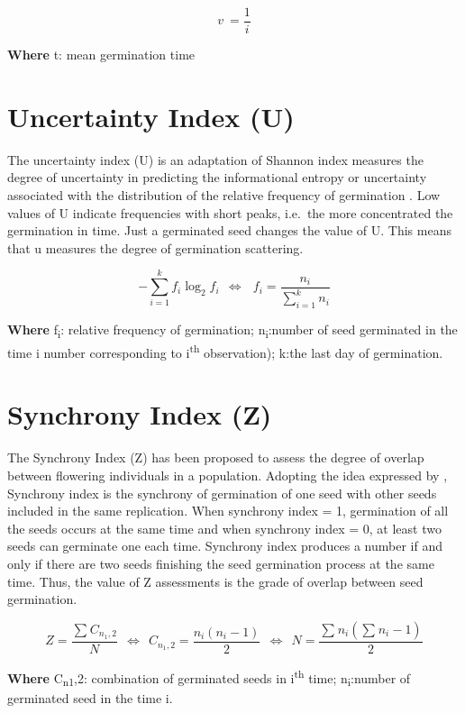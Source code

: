 \documentclass[]{book}
\begin{document}
\[ v\ =\frac{1}{i} \]

\textbf{Where} t: mean germination time

\section{Uncertainty Index (U)}\label{uncertainty-index-u}

The uncertainty index (U) is an adaptation of Shannon index measures the
degree of uncertainty in predicting the informational entropy or
uncertainty associated with the distribution of the relative frequency
of germination \citep{GouveaLabouriau1983, Labouriau1983}. Low values of
U indicate frequencies with short peaks, i.e.~the more concentrated the
germination in time. Just a germinated seed changes the value of U. This
means that u measures the degree of germination scattering.

\[ -\sum_{i=1}^kf_i\log_2f_i\ \ \Leftrightarrow\ \ \ f_i=\frac{n_i}{\sum_{i=1}^kn_i}  \]

\textbf{Where} f\textsubscript{i}: relative frequency of germination;
n\textsubscript{i}:number of seed germinated in the time i number
corresponding to i\textsuperscript{th} observation); k:the last day of
germination.

\section{Synchrony Index (Z)}\label{synchrony-index-z}

The Synchrony Index (Z) has been proposed to assess the degree of
overlap between flowering individuals in a population. Adopting the idea
expressed by \citet{primack1985patterns}, Synchrony index is the
synchrony of germination of one seed with other seeds included in the
same replication. When synchrony index = 1, germination of all the seeds
occurs at the same time and when synchrony index = 0, at least two seeds
can germinate one each time. Synchrony index produces a number if and
only if there are two seeds finishing the seed germination process at
the same time. Thus, the value of Z assessments is the grade of overlap
between seed germination.

\[Z=\frac{\sum_{ }^{ }C_{n_1,2}}{N}\ \ \Leftrightarrow\ \ C_{n_1,2}=\frac{n_i\left(n_i-1\right)}{2}\ \ \Leftrightarrow\ \ N=\frac{\sum_{ }^{ }n_i\left(\sum_{ }^{ }n_i-1\right)}{2}\]

\textbf{Where} C\textsubscript{n1},2: combination of germinated seeds in
i\textsuperscript{th} time; n\textsubscript{i}:number of germinated seed
in the time i.
\end{document}
